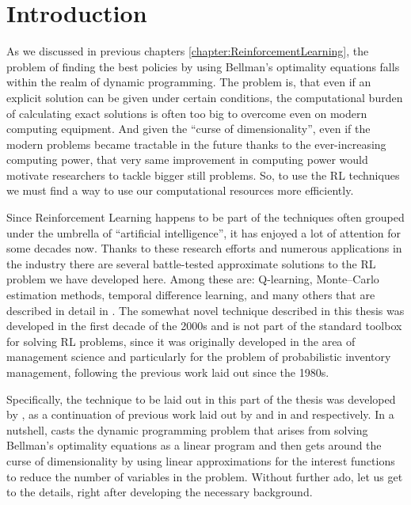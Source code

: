 \section{Introduction}

As we discussed in previous chapters \ref{chapter:ReinforcementLearning}, the
problem of finding the best policies by using Bellman's optimality equations
falls within the realm of dynamic programming. The problem is, that even if an
explicit solution can be given under certain conditions, the computational
burden of calculating exact solutions is often too big to overcome even on
modern computing equipment. And given the ``curse of dimensionality'', even if
the modern problems became tractable in the future thanks to the ever-increasing
computing power, that very same improvement in computing power would motivate
researchers to tackle bigger still problems. So, to use the RL techniques we
must find a way to use our computational resources more efficiently. 

Since Reinforcement Learning happens to be part of the techniques often grouped
under the umbrella of ``artificial intelligence'', it has enjoyed a lot of
attention for some decades now. Thanks to these research efforts and numerous
applications in the industry there are several battle-tested approximate
solutions to the RL problem we have developed here. Among these are: Q-learning,
Monte--Carlo estimation methods, temporal difference learning, and many others
that are described in detail in \cite[Chapter~4]{SuttonBarto}. The somewhat novel technique
described in this thesis was developed in the first decade of the 2000s and is
not part of the standard toolbox for solving RL problems, since it was
originally developed in the area of management science and particularly for the
problem of probabilistic inventory management, following the previous work laid
out since the 1980s. 

Specifically, the technique to be laid out in this part of the thesis was
developed by \citeauthor*{farias2003LP2ADP}, as a continuation of previous work
laid out by \citeauthor*{denardo1970} and \citeauthor*{depenoux1963} in
\cite{denardo1970} and \cite{depenoux1963} respectively. In a nutshell,
\citeauthor*{farias2002thesis} casts the dynamic programming problem that arises
from solving Bellman's optimality equations as a linear program and then gets
around the curse of dimensionality by using linear approximations for the
interest functions to reduce the number of variables in the problem. Without
further ado, let us get to the details, right after developing the necessary
background.

